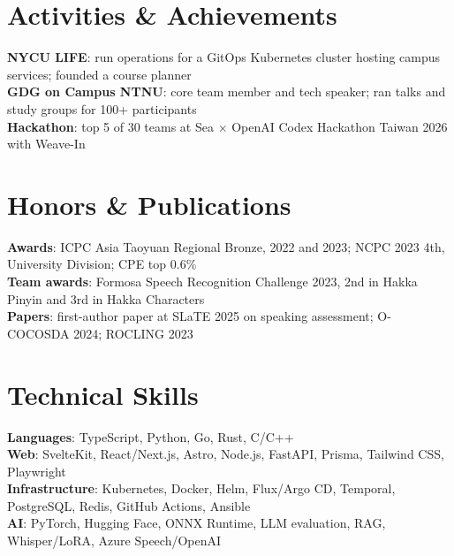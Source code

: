 \documentclass[a4paper,11pt]{article}
\begin{document}
\section{Activities \& Achievements}
 \begin{itemize}[leftmargin=0.15in, label={}]
    \small{\item{
     \textbf{NYCU LIFE}{: run operations for a GitOps Kubernetes cluster hosting campus services; founded a course planner} \\
     \textbf{GDG on Campus NTNU}{: core team member and tech speaker; ran talks and study groups for 100+ participants} \\
     \textbf{Hackathon}{: top 5 of 30 teams at Sea $\times$ OpenAI Codex Hackathon Taiwan 2026 with Weave-In}
    }}
 \end{itemize}

\section{Honors \& Publications}
 \begin{itemize}[leftmargin=0.15in, label={}]
    \small{\item{
     \textbf{Awards}{: ICPC Asia Taoyuan Regional Bronze, 2022 and 2023; NCPC 2023 4th, University Division; CPE top 0.6\%} \\
     \textbf{Team awards}{: Formosa Speech Recognition Challenge 2023, 2nd in Hakka Pinyin and 3rd in Hakka Characters} \\
     \textbf{Papers}{: first-author paper at SLaTE 2025 on speaking assessment; O-COCOSDA 2024; ROCLING 2023}
    }}
 \end{itemize}

\section{Technical Skills}
 \begin{itemize}[leftmargin=0.15in, label={}]
    \small{\item{
     \textbf{Languages}{: TypeScript, Python, Go, Rust, C/C++} \\
     \textbf{Web}{: SvelteKit, React/Next.js, Astro, Node.js, FastAPI, Prisma, Tailwind CSS, Playwright} \\
     \textbf{Infrastructure}{: Kubernetes, Docker, Helm, Flux/Argo CD, Temporal, PostgreSQL, Redis, GitHub Actions, Ansible} \\
     \textbf{AI}{: PyTorch, Hugging Face, ONNX Runtime, LLM evaluation, RAG, Whisper/LoRA, Azure Speech/OpenAI}
    }}
 \end{itemize}
\end{document}
